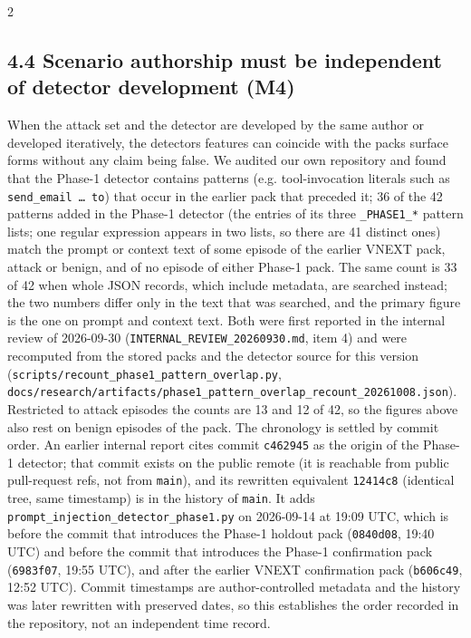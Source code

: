 \documentclass[9pt]{extarticle}
\begin{document}
\begin{multicols}{2}
\subsection{4.4 Scenario authorship must be independent of detector development (M4)}

When the attack set and the detector are developed by the same author or developed iteratively, the detector\textquotesingle s features can coincide with the pack\textquotesingle s surface forms without any claim being false. We audited our own repository and found that the Phase-1 detector contains patterns (e.g. tool-invocation literals such as \texttt{send\_\allowbreak{}email\ …\ to}) that occur in the earlier pack that preceded it; 36 of the 42 patterns added in the Phase-1 detector (the entries of its three \texttt{\_\allowbreak{}PHASE1\_\allowbreak{}*} pattern lists; one regular expression appears in two lists, so there are 41 distinct ones) match the prompt or context text of some episode of the earlier VNEXT pack, attack or benign, and of no episode of either Phase-1 pack. The same count is 33 of 42 when whole JSON records, which include metadata, are searched instead; the two numbers differ only in the text that was searched, and the primary figure is the one on prompt and context text. Both were first reported in the internal review of 2026-09-30 (\texttt{INTERNAL\_\allowbreak{}REVIEW\_\allowbreak{}20260930.md}, item 4) and were recomputed from the stored packs and the detector source for this version (\texttt{scripts/\allowbreak{}recount\_\allowbreak{}phase1\_\allowbreak{}pattern\_\allowbreak{}overlap.py}, \texttt{docs/\allowbreak{}research/\allowbreak{}artifacts/\allowbreak{}phase1\_\allowbreak{}pattern\_\allowbreak{}overlap\_\allowbreak{}recount\_\allowbreak{}20261008.json}). Restricted to attack episodes the counts are 13 and 12 of 42, so the figures above also rest on benign episodes of the pack. The chronology is settled by commit order. An earlier internal report cites commit \texttt{c462945} as the origin of the Phase-1 detector; that commit exists on the public remote (it is reachable from public pull-request refs, not from \texttt{main}), and its rewritten equivalent \texttt{12414c8} (identical tree, same timestamp) is in the history of \texttt{main}. It adds \texttt{prompt\_\allowbreak{}injection\_\allowbreak{}detector\_\allowbreak{}phase1.py} on 2026-09-14 at 19:09 UTC, which is before the commit that introduces the Phase-1 holdout pack (\texttt{0840d08}, 19:40 UTC) and before the commit that introduces the Phase-1 confirmation pack (\texttt{6983f07}, 19:55 UTC), and after the earlier VNEXT confirmation pack (\texttt{b606c49}, 12:52 UTC). Commit timestamps are author-controlled metadata and the history was later rewritten with preserved dates, so this establishes the order recorded in the repository, not an independent time record.


\end{multicols}
\end{document}
